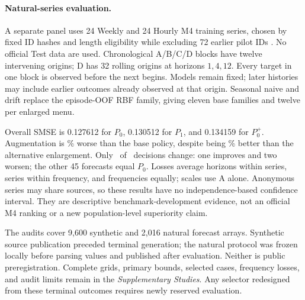 \paragraph{Natural-series evaluation.}
A separate panel uses 24 Weekly and 24 Hourly M4 training series, chosen
by fixed ID hashes and length eligibility while excluding 72 earlier
pilot IDs \citep{M4DataSnapshot2026}. No official Test data are used.
Chronological A/B/C/D blocks have twelve intervening origins; D has
32 rolling origins at horizons $1,4,12$. Every target in one block is
observed before the next begins. Models remain fixed; later histories
may include earlier outcomes already observed at that origin. Seasonal
naive and drift replace the episode-OOF RBF family, giving eleven base
families and twelve per enlarged menu.

Overall SMSE is 0.127612 for $P_0$, 0.130512 for $P_1$, and 0.134159
for $P_0^+$. Augmentation is \PANaturalPenalty\% worse than the base
policy, despite being \PANaturalGainExtra\% better than the alternative
enlargement. Only \PANaturalSelections\ of \PANaturalSeries\ decisions
change: one improves and two worsen; the other 45 forecasts equal $P_0$.
Losses average horizons within series, series within frequency, and
frequencies equally; scales use A alone. Anonymous series may share
sources, so these results have no independence-based confidence interval.
They are descriptive benchmark-development evidence, not an official
M4 ranking or a new population-level superiority claim.

The audits cover 9,600 synthetic and 2,016 natural forecast arrays.
Synthetic source publication preceded terminal generation; the natural
protocol was frozen locally before parsing values and published after
evaluation. Neither is public preregistration. Complete grids, primary
bounds, selected cases, frequency losses, and audit limits remain in the
\emph{Supplementary Studies}. Any selector redesigned from these terminal
outcomes requires newly reserved evaluation.
